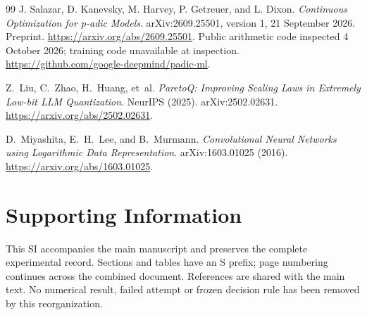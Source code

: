 \documentclass[11pt]{article}
\begin{document}
\begin{thebibliography}{99}
J. Salazar, D. Kanevsky, M. Harvey, P. Getreuer, and L. Dixon.
\emph{Continuous Optimization for p-adic Models}.
arXiv:2609.25501, version 1, 21 September 2026. Preprint.
\url{https://arxiv.org/abs/2609.25501}.
Public arithmetic code inspected 4 October 2026; training code unavailable at inspection.
\url{https://github.com/google-deepmind/padic-ml}.

Z.~Liu, C.~Zhao, H.~Huang, et~al.
\emph{ParetoQ: Improving Scaling Laws in Extremely Low-bit LLM Quantization}.
NeurIPS (2025). arXiv:2502.02631.
\url{https://arxiv.org/abs/2502.02631}.

D.~Miyashita, E.~H.~Lee, and B.~Murmann.
\emph{Convolutional Neural Networks using Logarithmic Data Representation}.
arXiv:1603.01025 (2016).
\url{https://arxiv.org/abs/1603.01025}.

\end{thebibliography}
\clearpage
\setcounter{section}{0}
\setcounter{subsection}{0}
\setcounter{table}{0}
\setcounter{equation}{0}
\setcounter{proposition}{0}
\setcounter{definition}{0}
\renewcommand{\thesection}{S\arabic{section}}
\renewcommand{\thetable}{S\arabic{table}}
\renewcommand{\theequation}{S\arabic{equation}}
\renewcommand{\theproposition}{S\arabic{proposition}}
\renewcommand{\thedefinition}{S\arabic{definition}}
\renewcommand{\theHsection}{SI.\arabic{section}}
\renewcommand{\theHtable}{SI.\arabic{table}}
\renewcommand{\theHequation}{SI.\arabic{equation}}
\section*{Supporting Information}
\label{si:start}

This SI accompanies the main manuscript and preserves the complete
experimental record. Sections and tables have an S prefix; page numbering
continues across the combined document. References are shared with the main
text. No numerical result, failed attempt or frozen decision rule has been
removed by this reorganization.
\end{document}
